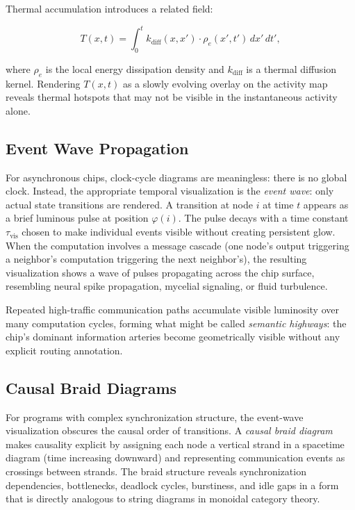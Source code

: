 \documentclass[11pt, a4paper]{article}
\begin{document}
Thermal accumulation introduces a related field:

\[
T(x, t) = \int_0^t k_{\text{diff}}(x, x') \cdot \rho_e(x', t')\, dx'\, dt',
\]

where $\rho_e$ is the local energy dissipation density and $k_{\text{diff}}$
is a thermal diffusion kernel. Rendering $T(x,t)$ as a slowly evolving overlay
on the activity map reveals thermal hotspots that may not be visible in the
instantaneous activity alone.

\subsection{Event Wave Propagation}

For asynchronous chips, clock-cycle diagrams are meaningless: there is no global
clock. Instead, the appropriate temporal visualization is the \emph{event wave}:
only actual state transitions are rendered. A transition at node $i$ at time $t$
appears as a brief luminous pulse at position $\varphi(i)$. The pulse decays
with a time constant $\tau_{\text{vis}}$ chosen to make individual events visible
without creating persistent glow. When the computation involves a message cascade
(one node's output triggering a neighbor's computation triggering the next
neighbor's), the resulting visualization shows a wave of pulses propagating
across the chip surface, resembling neural spike propagation, mycelial signaling,
or fluid turbulence.

Repeated high-traffic communication paths accumulate visible luminosity over many
computation cycles, forming what might be called \emph{semantic highways}: the
chip's dominant information arteries become geometrically visible without any
explicit routing annotation.

\subsection{Causal Braid Diagrams}

For programs with complex synchronization structure, the event-wave visualization
obscures the causal order of transitions. A \emph{causal braid diagram} makes
causality explicit by assigning each node a vertical strand in a spacetime diagram
(time increasing downward) and representing communication events as crossings
between strands. The braid structure reveals synchronization dependencies,
bottlenecks, deadlock cycles, burstiness, and idle gaps in a form that is
directly analogous to string diagrams in monoidal category theory.
\end{document}
